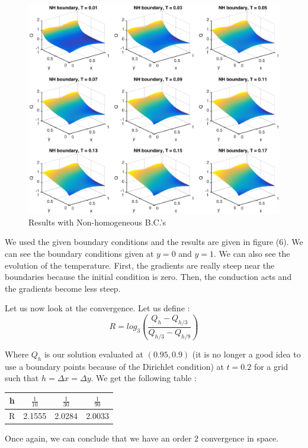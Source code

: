 \begin{figure}[!htb]
\centering
\includegraphics[scale=.6]{boundConv.eps}
\caption{Results with Non-homogeneous B.C.'s}
\label{fig:digraph}
\end{figure}

We used the given boundary conditions and the results are given in figure (6). We can see the boundary conditions given at $y=0$ and $y=1$. We can also see the evolution of the temperature. First, the gradients are really steep near the boundaries because the initial condition is zero. Then, the conduction acts and the gradients become less steep.

Let us now look at the convergence. Let us define : 
$$R = log_3(\frac{Q_h-Q_{h/3}}{Q_{h/3}-Q_{h/9}})$$

Where $Q_h$ is our solution evaluated at $(0.95,0.9)$ (it is no longer a good idea to use a boundary points because of the Dirichlet condition) at $t=0.2$ for a grid such that $h = \Delta x = \Delta y$. We get the following table : 
\begin{center}
\begin{tabular}{|c|c|c|c|}
\hline 
h & $\frac{1}{10}$ & $\frac{1}{30}$ & $\frac{1}{90}$ \\ 
\hline 
R & 2.1555 & 2.0284 & 2.0033 \\ 
\hline 
\end{tabular} 
\end{center}

Once again, we can conclude that we have an order 2 convergence in space.

